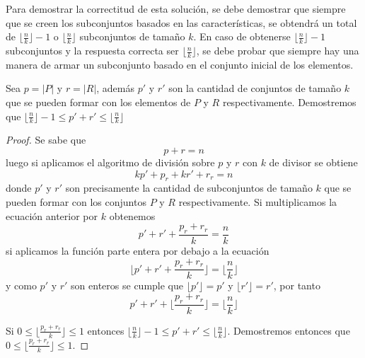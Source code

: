 \documentclass{article}
\begin{document}
Para demostrar la correctitud de esta solución, se debe demostrar que siempre 
que se creen los subconjuntos basados en las características, se obtendrá un total de 
$\lfloor \frac{n}{k} \rfloor - 1$ o $\lfloor \frac{n}{k} \rfloor$ subconjuntos de tamaño 
$k$. En caso de obtenerse $\lfloor \frac{n}{k} \rfloor - 1$ subconjuntos y la respuesta 
correcta ser $\lfloor \frac{n}{k} \rfloor$, se debe probar que siempre hay una manera de 
armar un subconjunto basado en el conjunto inicial de los elementos.

Sea $p = |P|$ y $r = |R|$, además $p'$ y $r'$ son la cantidad de conjuntos de tamaño $k$
que se pueden formar con los elementos de $P$ y $R$ respectivamente.
Demostremos que $\lfloor \frac{n}{k} \rfloor - 1 \leq p' + r' \leq \lfloor \frac{n}{k} \rfloor$
\begin{proof}
    
    Se sabe que
    \begin{equation*}
        p + r = n
    \end{equation*}
    luego si aplicamos el algoritmo de división sobre $p$ y $r$ con $k$ de divisor se obtiene
    \begin{equation*}
        kp' + p_r + kr' + r_r = n
    \end{equation*}
    donde $p'$ y $r'$ son precisamente la cantidad de subconjuntos de tamaño $k$ que se pueden
    formar con los conjuntos $P$ y $R$ respectivamente. Si multiplicamos la ecuación anterior 
    por $k$ obtenemos
    \begin{equation*}
        p' + r' + \frac{p_r + r_r}{k} = \frac{n}{k}
    \end{equation*}
    si aplicamos la función parte entera por debajo a la ecuación
    \begin{equation*}
        \lfloor p' + r' + \frac{p_r + r_r}{k} \rfloor = \lfloor \frac{n}{k}\rfloor
    \end{equation*}
    y como $p'$ y $r'$ son enteros se cumple que $\lfloor p' \rfloor = p'$ y 
    $\lfloor r' \rfloor = r'$, por tanto 
    \begin{equation*}
        p' + r' + \lfloor \frac{p_r + r_r}{k} \rfloor = \lfloor \frac{n}{k} \rfloor
    \end{equation*}

    Si $0 \leq \lfloor \frac{p_r + r_r}{k} \rfloor \leq 1$ entonces 
    $\lfloor \frac{n}{k} \rfloor - 1 \leq p' + r' \leq \lfloor \frac{n}{k} \rfloor$. Demostremos 
    entonces que $0 \leq \lfloor \frac{p_r + r_r}{k} \rfloor \leq 1$.


\end{proof}
\end{document}
